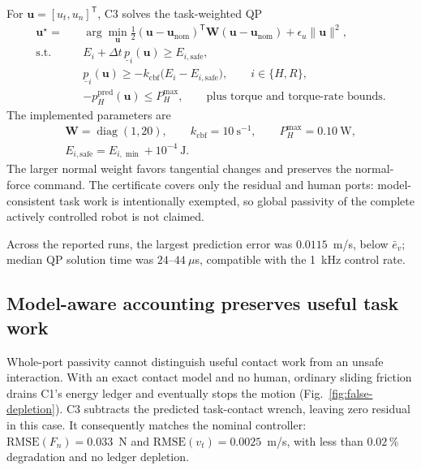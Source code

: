 For $\mathbf u=[u_t,u_n]^\mathsf{T}$, C3 solves the task-weighted QP
\begin{equation}
\begin{aligned}
\mathbf u^\star
={}&
\arg\min_{\mathbf u}
\frac12
(\mathbf u-\mathbf u_{\mathrm{nom}})^\mathsf{T}
\mathbf W
(\mathbf u-\mathbf u_{\mathrm{nom}})
+
\epsilon_u\|\mathbf u\|^2,
\\
\text{s.t.}\qquad
&E_i+\Delta t\,\underline p_i(\mathbf u)
\ge E_{i,\mathrm{safe}},
\\
&\underline p_i(\mathbf u)
\ge
-k_{\mathrm{cbf}}
\bigl(E_i-E_{i,\mathrm{safe}}\bigr),
\qquad i\in\{H,R\},
\\
&-p_H^{\mathrm{pred}}(\mathbf u)
\le P_H^{\max},
\qquad
\text{plus torque and torque-rate bounds}.
\end{aligned}
\end{equation}
The implemented parameters are
\[
\begin{gathered}
\mathbf W=\operatorname{diag}(1,20),
\qquad
k_{\mathrm{cbf}}=10~\mathrm{s}^{-1},
\qquad
P_H^{\max}=0.10~\mathrm{W},
\\
E_{i,\mathrm{safe}}=E_{i,\min}+10^{-4}~\mathrm{J}.
\end{gathered}
\]
The larger normal weight favors tangential changes and preserves the
normal-force command. The certificate covers only the residual and human
ports: model-consistent task work is intentionally exempted, so global
passivity of the complete actively controlled robot is not claimed.
\endgroup

Across the reported runs, the largest prediction error was $0.0115$~m/s,
below $\bar e_v$; median QP solution time was $24$--$44~\mu$s, compatible
with the 1~kHz control rate.

\FloatBarrier
\subsection{Model-aware accounting preserves useful task work}
\label{sec:res-exemption}

Whole-port passivity cannot distinguish useful contact work from an unsafe
interaction. With an exact contact model and no human, ordinary sliding
friction drains C1's energy ledger and eventually stops the motion
(Fig.~\ref{fig:false-depletion}). C3 subtracts the predicted task-contact
wrench, leaving zero residual in this case. It consequently matches the
nominal controller: $\mathrm{RMSE}(F_n)=0.033$~N and
$\mathrm{RMSE}(v_t)=0.0025$~m/s, with less than $0.02\,\%$ degradation and
no ledger depletion.

